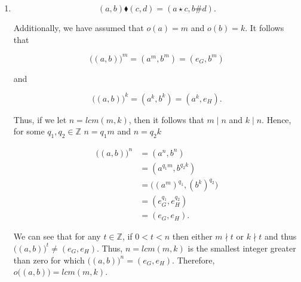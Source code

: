 \documentclass[12pt]{article}
\makeatletter
\theoremstyle{definition}
\theoremstyle{remark}
\renewenvironment{proof}[1][\proofname]{\par
  \pushQED{\qed}%
  \normalfont \topsep6\p@\@plus6\p@\relax
  \list{}{\leftmargin=0mm
          \rightmargin=0mm
          \settowidth{\itemindent}{\itshape#1}%
          \labelwidth=\itemindent
          \parsep=0pt \listparindent=\parindent 
  }
  \item[\hskip\labelsep
        \itshape
    #1\@addpunct{.}]\ignorespaces
}{%
  \popQED\endlist\@endpefalse
}
\let\oldproofname=\proofname
\renewcommand{\proofname}{\bf{\textit{\oldproofname}}}
\makeatother
\begin{document}
\begin{enumerate}[leftmargin=*]
\begin{proof}
                \begin{equation*}
                    (a,b)\blacklozenge(c,d)=(a\star c,b\# d).
                \end{equation*}
                
                Additionally, we have assumed that $o(a)=m$ and $o(b)=k$. It follows that 
                
                \begin{equation*}
                    \big((a,b)\big)^m=(a^m,b^m)=(e_G,b^m)
                \end{equation*}
                
                and
                
                \begin{equation*}
                    \big((a,b)\big)^k=(a^k,b^k)=(a^k,e_H).
                \end{equation*}
                
                Thus, if we let $n=lcm(m,k)$, then it follows that $m\mid n$ and $k\mid n$. Hence, for some $q_1,q_2\in\mathbb{Z}$ $n=q_1m$ and $n=q_2k$
                
                \begin{equation*}
                    \begin{split}
                        \big((a,b)\big)^n &= (a^n,b^n) \\
                        &= (a^{q_1m},b^{q_2k}) \\
                        &= \big((a^m)^{q_1},(b^k)^{q_2}\big) \\
                        &= (e_G^{q_1},e_H^{q_2}) \\
                        &= (e_G,e_H). 
                    \end{split}
                \end{equation*}
                
                We can see that for any $t\in\mathbb{Z}$, if $0<t<n$ then  either $m\nmid t$ or $k\nmid t$ and thus $\big((a,b)\big)^t\neq (e_G,e_H)$. Thus, $n=lcm(m,k)$ is the smallest integer greater than zero for which $\big((a,b)\big)^n=(e_G,e_H)$. Therefore, $o\big((a,b)\big)=lcm(m,k)$.
            \end{proof}
            

\end{enumerate}
\end{document}
